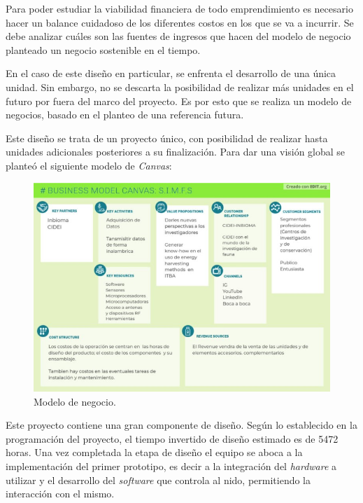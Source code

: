 Para poder estudiar la viabilidad financiera de todo emprendimiento es necesario hacer un balance cuidadoso de los diferentes costos en los que se va a incurrir. Se debe analizar cuáles son las fuentes de ingresos que hacen del modelo de negocio planteado un negocio sostenible en el tiempo.

En el caso de este diseño en particular, se enfrenta el desarrollo de una única unidad. Sin embargo, no se descarta la posibilidad de realizar más unidades en el futuro por fuera del marco del proyecto. Es por esto que se realiza un modelo de negocios, basado en el planteo de una referencia futura. 

Este diseño se trata de un proyecto único, con posibilidad de realizar hasta \unidadespostfin unidades adicionales posteriores a su finalización. Para dar una visión global se planteó el siguiente modelo de \textit{Canvas}:
\begin{figure}[H]
	\centering
	\includegraphics[scale=0.7]{../Factibilidad/ImagenesFactibilidad/ModeloDeCanvas}
	\caption{Modelo de negocio.}
	\label{fig:modelodecanvas}
\end{figure}

Este proyecto contiene una gran componente de diseño. Según lo establecido en la programación del proyecto, el tiempo invertido de diseño estimado es de 5472 horas. %
Una vez completada la etapa de diseño el equipo se aboca a la implementación del primer prototipo, es decir a la integración del \textit{hardware} a utilizar y el desarrollo del \textit{software} que controla al nido, permitiendo la interacción con el mismo. 

